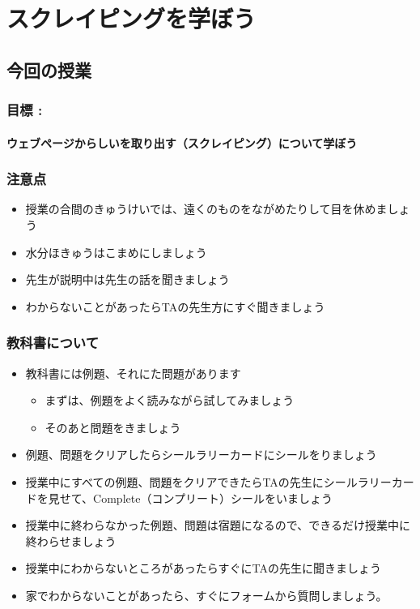 \chapter{スクレイピングを学ぼう}
\section{今回の授業}
\subsection*{目標 : }
\subsubsection*{ウェブページからしいを取り出す（スクレイピング）について学ぼう}
\subsection*{注意点}
\begin{itemize}
\item
授業の合間のきゅうけいでは、遠くのものをながめたりして目を休めましょう
\item 水分ほきゅうはこまめにしましょう
\item
先生が説明中は先生の話を聞きましょう
\item
わからないことがあったらTAの先生方にすぐ聞きましょう
\end{itemize}
\subsection*{教科書について}
\begin{itemize}
\item
教科書には例題、それにた問題があります

\begin{itemize}
\item
まずは、例題をよく読みながら試してみましょう
\item そのあと問題をきましょう
\end{itemize}
\item
例題、問題をクリアしたらシールラリーカードにシールをりましょう
\item
授業中にすべての例題、問題をクリアできたらTAの先生にシールラリーカードを見せて、Complete（コンプリート）シールをいましょう
\item
授業中に終わらなかった例題、問題は宿題になるので、できるだけ授業中に終わらせましょう
\item
授業中にわからないところがあったらすぐにTAの先生に聞きましょう
\item
家でわからないことがあったら、すぐにフォームから質問しましょう。
\end{itemize}

